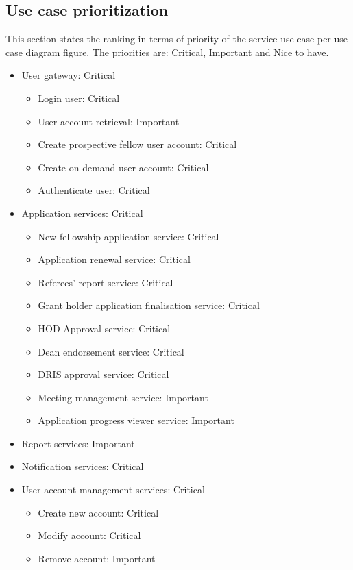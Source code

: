 \documentclass[12pt]{article}
\begin{document}
\newpage
\subsection{Use case prioritization}
\vspace{0.2in}
This section states the ranking in terms of priority of the service use case per use case diagram figure. The priorities are: Critical, Important and Nice to have.\\ 
\begin{itemize}
	\item User gateway: Critical
	\begin{itemize}
		\item Login user: Critical
		\item User account retrieval: Important
		\item Create prospective fellow user account: Critical
		\item Create on-demand user account: Critical
		\item Authenticate user: Critical
	\end{itemize}
	\item Application services: Critical
	\begin{itemize}
		\item New fellowship application service: Critical
		\item Application renewal service: Critical
		\item Referees' report service: Critical
		\item Grant holder application finalisation service: Critical
		\item HOD Approval service: Critical
		\item Dean endorsement service: Critical
		\item DRIS approval service: Critical		
		\item Meeting management service: Important
		\item Application progress viewer service: Important
	\end{itemize}
	\item Report services: Important
	\item Notification services: Critical
	\item User account management services: Critical
	\begin{itemize}
		\item Create new account: Critical
		\item Modify account: Critical
		\item Remove account: Important

\end{itemize}
\end{itemize}
\end{document}

